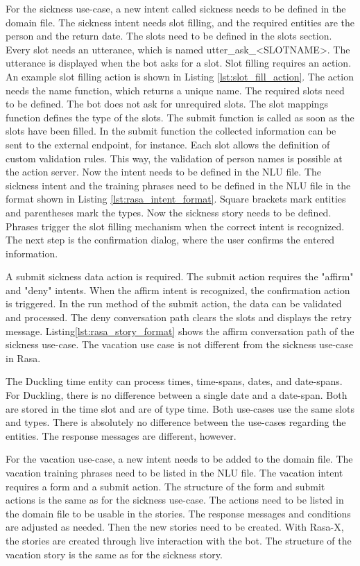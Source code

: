 For the sickness use-case, a new intent called sickness needs to be defined in the domain file.
The sickness intent needs slot filling, and the required entities are the 
person and the return date. 
The slots need to be defined in the slots section.
Every slot needs an utterance, which is named utter\_ask\_<SLOTNAME>.
The utterance is displayed when the bot asks for a slot.
Slot filling requires an action.
An example slot filling action is shown in Listing \ref{lst:slot_fill_action}.
The action needs the name function, which returns a unique name.
The required slots need to be defined.
The bot does not ask for unrequired slots.
The slot mappings function defines the type of the slots.
The submit function is called as soon as the slots have been filled.
In the submit function the collected information can be sent to the 
external endpoint, for instance.
Each slot allows the definition of custom validation rules.
This way, the validation of person names is possible at the action server.
Now the intent needs to be defined in the NLU file.
The sickness intent and the training phrases need to be defined in the 
NLU  file in the format shown in Listing \ref{lst:rasa_intent_format}.
Square brackets mark entities and parentheses mark the types.
Now the sickness story needs to be defined.
Phrases trigger the slot filling mechanism when the correct intent is recognized.
The next step is the confirmation dialog, where the user confirms the entered information.

A submit sickness data action is required.
The submit action requires the "affirm" and "deny" intents.
When the affirm intent is recognized, the confirmation action is triggered.
In the run method of the submit action, the data can be validated and processed.
The deny conversation path clears the slots and displays the retry message.
Listing\ref{lst:rasa_story_format} shows the affirm conversation path of the sickness use-case.
The vacation use case is not different from the sickness use-case in Rasa.

The Duckling time entity can process times, time-spans, dates, and date-spans.
For Duckling, there is no difference between a single date and a date-span.
Both are stored in the time slot and are of type time.
Both use-cases use the same slots and types.
There is absolutely no difference between the use-cases regarding the entities.
The response messages are different, however.

For the vacation use-case, a new intent needs to be added to the domain file.
The vacation training phrases need to be listed in the NLU file.
The vacation intent requires a form and a submit action.
The structure of the form and submit actions is the same as for the sickness use-case.
The actions need to be listed in the domain file to be usable in the stories.
The response messages and conditions are adjusted as needed.
Then the new stories need to be created.
With Rasa-X, the stories are created through live interaction with the bot.
The structure of the vacation story is the same as for the sickness story.



